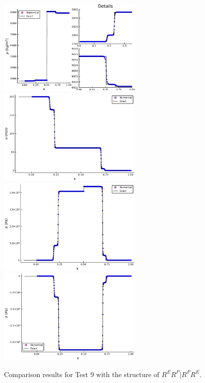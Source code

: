 \documentclass{article}
\numberwithin{equation}{section}
\numberwithin{table}{section}
\begin{document}
\begin{figure}[ht]
  \centering
  \includegraphics[width= 7cm] {case6rho.pdf}
  \includegraphics[width= 7cm] {case6u.pdf}
  \includegraphics[width= 7cm] {case6p.pdf}
  \includegraphics[width= 7cm] {case6sigma.pdf}

    \caption{Comparison results for Test 9 with the structure of $R^ER^P|R^PR^E$.  }
  \label{fig:case7}
\end{figure}
\end{document}
